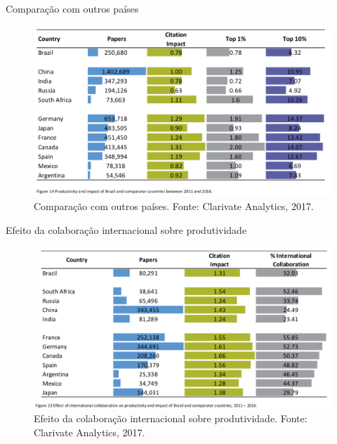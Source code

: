 \begin{frame}{Comparação com outros países}
\begin{figure}
\centering
\includegraphics[scale=0.25]{figs/01/panorama-prod-paises}
\caption{Comparação com outros países. Fonte: Clarivate Analytics, 2017.}
\end{figure}
\end{frame}


\begin{frame}{Efeito da colaboração internacional sobre produtividade}
\begin{figure}
\centering
\includegraphics[scale=0.25]{figs/01/panorama-colaboracao}
\caption{Efeito da colaboração internacional sobre produtividade. Fonte: Clarivate Analytics, 2017.}
\end{figure}
\end{frame}


